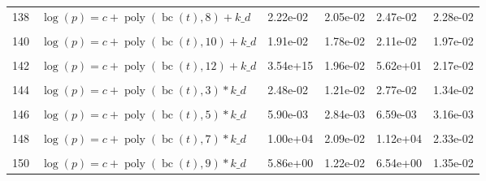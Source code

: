 \documentclass[12pt,a4paper]{article}
\DeclareMathOperator{\bc}{bc}
\DeclareMathOperator{\poly}{poly}
\begin{document}
\begin{longtable}[t]{ll>{\raggedleft\arraybackslash}p{2cm}>{\raggedleft\arraybackslash}p{2cm}>{\raggedleft\arraybackslash}p{2cm}>{\raggedleft\arraybackslash}p{2cm}}
138 & $\log(p) = c + \poly\left( \bc(t), 8 \right) + k\_d$ & 2.22e-02 & 2.05e-02 & 2.47e-02 & 2.28e-02\\
\cellcolor{gray!6}{139} & \cellcolor{gray!6}{$\log(p) = c + \poly\left( \bc(t), 9 \right) + k\_d$} & \cellcolor{gray!6}{1.88e-02} & \cellcolor{gray!6}{1.78e-02} & \cellcolor{gray!6}{2.08e-02} & \cellcolor{gray!6}{1.97e-02}\\
140 & $\log(p) = c + \poly\left( \bc(t), 10 \right) + k\_d$ & 1.91e-02 & 1.78e-02 & 2.11e-02 & 1.97e-02\\
\cellcolor{gray!6}{141} & \cellcolor{gray!6}{$\log(p) = c + \poly\left( \bc(t), 11 \right) + k\_d$} & \cellcolor{gray!6}{2.12e-02} & \cellcolor{gray!6}{2.00e-02} & \cellcolor{gray!6}{2.34e-02} & \cellcolor{gray!6}{2.21e-02}\\
142 & $\log(p) = c + \poly\left( \bc(t), 12 \right) + k\_d$ & 3.54e+15 & 1.96e-02 & 5.62e+01 & 2.17e-02\\
\cellcolor{gray!6}{143} & \cellcolor{gray!6}{$\log(p) = c + \poly\left( \bc(t), 13 \right) + k\_d$} & \cellcolor{gray!6}{3.75e+20} & \cellcolor{gray!6}{1.79e-02} & \cellcolor{gray!6}{2.01e-02} & \cellcolor{gray!6}{1.98e-02}\\
144 & $\log(p) = c + \poly\left( \bc(t), 3 \right) * k\_d$ & 2.48e-02 & 1.21e-02 & 2.77e-02 & 1.34e-02\\
\cellcolor{gray!6}{145} & \cellcolor{gray!6}{$\log(p) = c + \poly\left( \bc(t), 4 \right) * k\_d$} & \cellcolor{gray!6}{1.68e-02} & \cellcolor{gray!6}{1.62e-02} & \cellcolor{gray!6}{1.87e-02} & \cellcolor{gray!6}{1.81e-02}\\
146 & $\log(p) = c + \poly\left( \bc(t), 5 \right) * k\_d$ & 5.90e-03 & 2.84e-03 & 6.59e-03 & 3.16e-03\\
\cellcolor{gray!6}{147} & \cellcolor{gray!6}{$\log(p) = c + \poly\left( \bc(t), 6 \right) * k\_d$} & \cellcolor{gray!6}{8.66e-03} & \cellcolor{gray!6}{7.40e-03} & \cellcolor{gray!6}{9.67e-03} & \cellcolor{gray!6}{8.26e-03}\\
148 & $\log(p) = c + \poly\left( \bc(t), 7 \right) * k\_d$ & 1.00e+04 & 2.09e-02 & 1.12e+04 & 2.33e-02\\
\cellcolor{gray!6}{149} & \cellcolor{gray!6}{$\log(p) = c + \poly\left( \bc(t), 8 \right) * k\_d$} & \cellcolor{gray!6}{2.95e-02} & \cellcolor{gray!6}{1.99e-02} & \cellcolor{gray!6}{3.04e-02} & \cellcolor{gray!6}{2.22e-02}\\
150 & $\log(p) = c + \poly\left( \bc(t), 9 \right) * k\_d$ & 5.86e+00 & 1.22e-02 & 6.54e+00 & 1.35e-02\\

\end{longtable}
\end{document}
